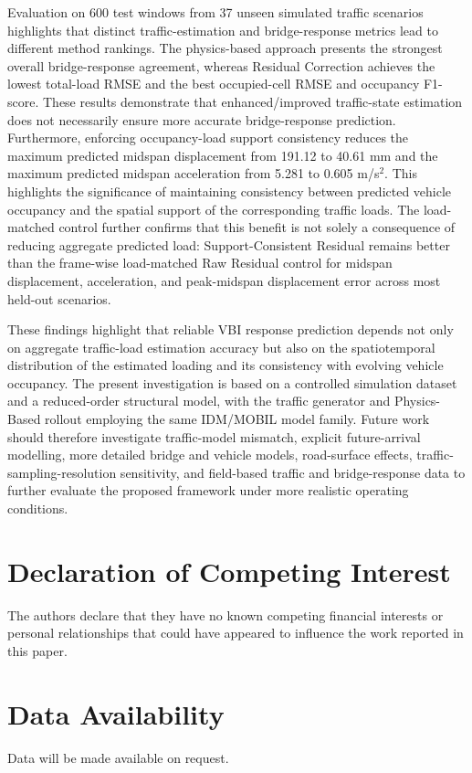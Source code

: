 \documentclass[journal]{IEEEtran}
\begin{document}
Evaluation on 600 test windows from 37 unseen simulated traffic scenarios highlights that distinct traffic-estimation and bridge-response metrics lead to different method rankings. The physics-based approach presents the strongest overall bridge-response agreement, whereas Residual Correction achieves the lowest total-load RMSE and the best occupied-cell RMSE and occupancy F1-score. These results demonstrate that enhanced/improved traffic-state estimation does not necessarily ensure more accurate bridge-response prediction. Furthermore, enforcing occupancy-load support consistency reduces the maximum predicted midspan displacement from 191.12 to 40.61 mm and the maximum predicted midspan acceleration from 5.281 to 0.605 m/s$^2$. This highlights the significance of maintaining consistency between predicted vehicle occupancy and the spatial support of the corresponding traffic loads. {\color{blue}The load-matched control further confirms that this benefit is not solely a consequence of reducing aggregate predicted load: Support-Consistent Residual remains better than the frame-wise load-matched Raw Residual control for midspan displacement, acceleration, and peak-midspan displacement error across most held-out scenarios.}

These findings highlight that reliable VBI response prediction depends not only on aggregate traffic-load estimation accuracy but also on the spatiotemporal distribution of the estimated loading and its consistency with evolving vehicle occupancy. The present investigation is based on a controlled simulation dataset and a reduced-order structural model, with the traffic generator and Physics-Based rollout employing the same IDM/MOBIL model family. {\color{blue}Future work should therefore investigate traffic-model mismatch, explicit future-arrival modelling, more detailed bridge and vehicle models, road-surface effects, traffic-sampling-resolution sensitivity, and field-based traffic and bridge-response data to further evaluate the proposed framework under more realistic operating conditions.}

\FloatBarrier

\section*{Declaration of Competing Interest}

The authors declare that they have no known competing financial interests or personal relationships that could have appeared to influence the work reported in this paper.

\section*{Data Availability}

Data will be made available on request.

\FloatBarrier



\end{document}
